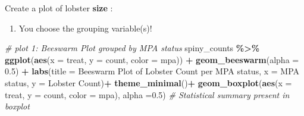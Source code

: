 \documentclass[
]{article}
\newenvironment{Shaded}{\begin{snugshade}}{\end{snugshade}}
\newcommand{\AttributeTok}[1]{\textcolor[rgb]{0.13,0.29,0.53}{#1}}
\newcommand{\CommentTok}[1]{\textcolor[rgb]{0.56,0.35,0.01}{\textit{#1}}}
\newcommand{\FloatTok}[1]{\textcolor[rgb]{0.00,0.00,0.81}{#1}}
\newcommand{\FunctionTok}[1]{\textcolor[rgb]{0.13,0.29,0.53}{\textbf{#1}}}
\newcommand{\NormalTok}[1]{#1}
\newcommand{\SpecialCharTok}[1]{\textcolor[rgb]{0.81,0.36,0.00}{\textbf{#1}}}
\newcommand{\StringTok}[1]{\textcolor[rgb]{0.31,0.60,0.02}{#1}}
\providecommand{\tightlist}{%
  \setlength{\itemsep}{0pt}\setlength{\parskip}{0pt}}
\begin{document}
Create a plot of lobster \textbf{size} :

\begin{enumerate}
\def\labelenumi{\arabic{enumi})}
\setcounter{enumi}{3}
\tightlist
\item
  You choose the grouping variable(s)!
\end{enumerate}

\begin{Shaded}
\begin{Highlighting}[]
\CommentTok{\# plot 1: Beeswarm Plot grouped by MPA status}
\NormalTok{spiny\_counts }\SpecialCharTok{\%\textgreater{}\%} 
\FunctionTok{ggplot}\NormalTok{(}\FunctionTok{aes}\NormalTok{(}\AttributeTok{x =}\NormalTok{ treat, }\AttributeTok{y =}\NormalTok{ count, }\AttributeTok{color =}\NormalTok{ mpa)) }\SpecialCharTok{+}
    \FunctionTok{geom\_beeswarm}\NormalTok{(}\AttributeTok{alpha =} \FloatTok{0.5}\NormalTok{) }\SpecialCharTok{+}
    \FunctionTok{labs}\NormalTok{(}\AttributeTok{title =} \StringTok{\textquotesingle{}Beeswarm Plot of Lobster Count per MPA status\textquotesingle{}}\NormalTok{,}
         \AttributeTok{x =} \StringTok{\textquotesingle{}MPA status\textquotesingle{}}\NormalTok{,}
         \AttributeTok{y =} \StringTok{\textquotesingle{}Lobster Count\textquotesingle{}}\NormalTok{)}\SpecialCharTok{+}
    \FunctionTok{theme\_minimal}\NormalTok{()}\SpecialCharTok{+}
    \FunctionTok{geom\_boxplot}\NormalTok{(}\FunctionTok{aes}\NormalTok{(}\AttributeTok{x =}\NormalTok{ treat, }\AttributeTok{y =}\NormalTok{ count, }\AttributeTok{color =}\NormalTok{ mpa), }\AttributeTok{alpha =}\FloatTok{0.5}\NormalTok{) }\CommentTok{\# Statistical summary present in boxplot}
\end{Highlighting}
\end{Shaded}
\end{document}
